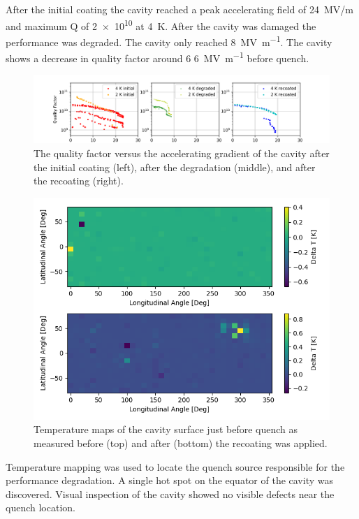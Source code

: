 \documentclass{revtex4-2}
\begin{document}
After the initial coating the cavity reached a peak accelerating field of 24~MV/m and maximum Q of \num{2e10} at \qty{4}{\kelvin}. After the cavity was damaged the performance was degraded. The cavity only reached \qty{8}{\mega\volt\per\meter}. The cavity shows a decrease in quality factor around 6 \qty{6}{\mega\volt\per\meter} before quench.

\begin{figure}[h]%
    \centering%
    \includegraphics[width=1.0\columnwidth]{./figures/VTS.png}%
    \caption{The quality factor versus the accelerating gradient of the cavity after the initial coating (left), after the degradation (middle), and after the recoating (right).}%
    \label{fig:VTS}%
\end{figure}

\begin{figure}[h]%
    \centering%
    \includegraphics{./figures/TMAP.png}%
    \caption{Temperature maps of the cavity surface just before quench as measured before (top) and after (bottom) the recoating was applied.}%
    \label{fig:VTS}%
\end{figure}

Temperature mapping was used to locate the quench source responsible for the performance degradation. A single hot spot on the equator of the cavity was discovered. Visual inspection of the cavity showed no visible defects near the quench location.
\end{document}
